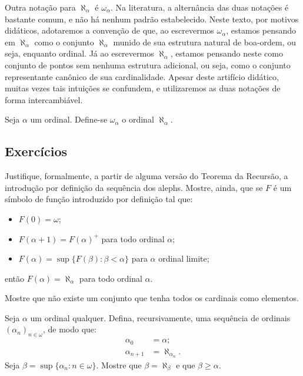 Outra notação para $\aleph_\alpha$ é $\omega_\alpha$.
Na literatura, a alternância das duas notações é bastante comum, e não há nenhum padrão estabelecido.
Neste texto, por motivos didáticos, adotaremos a convenção de que, ao escrevermos $\omega_\alpha$, estamos pensando em $\aleph_\alpha$ como o conjunto $\aleph_\alpha$ munido de sua estrutura natural de boa-ordem, ou seja, enquanto ordinal.
Já ao escrevermos $\aleph_\alpha$, estamos pensando neste como conjunto de pontos sem nenhuma estrutura adicional, ou seja, como o conjunto representante canônico de sua cardinalidade.
Apesar deste artifício didático, muitas vezes tais intuições se confundem, e utilizaremos as duas notações de forma intercambiável.

\begin{definition}
    Seja $\alpha$ um ordinal.
    Define-se $\omega_\alpha$ o ordinal $\aleph_\alpha$.
\end{definition}

\subsection{Exercícios}
\begin{exercise}
Justifique, formalmente, a partir de alguma versão do Teorema da Recursão, a introdução por definição da sequência dos alephs.
Mostre, ainda, que se $F$ é um símbolo de função introduzido por definição tal que:
\begin{itemize}
    \item $F(0)= \omega$;
    \item $F(\alpha+1) = F(\alpha)^+$ para todo ordinal $\alpha$;
    \item $F(\alpha)= \sup\{F(\beta) : \beta < \alpha\}$ para $\alpha$ ordinal limite;
\end{itemize}
então $F(\alpha) = \aleph_\alpha$ para todo ordinal $\alpha$.
\end{exercise}
\begin{exercise}
    Mostre que não existe um conjunto que tenha todos os cardinais como elementos.
\end{exercise}
\begin{exercise}
    Seja $\alpha$ um ordinal qualquer.
    Defina, recursivamente, uma sequência de ordinais $(\alpha_n)_{n\in\omega}$, de modo que:
    \begin{align*}
        \alpha_0 & = \alpha; \\
        \alpha_{n+1} & = \aleph_{\alpha_n}.
    \end{align*}
    Seja $\beta=\sup\{\alpha_n : n\in\omega\}$.
    Mostre que $\beta=\aleph_\beta$ e que $\beta\geq\alpha$.
\end{exercise}
